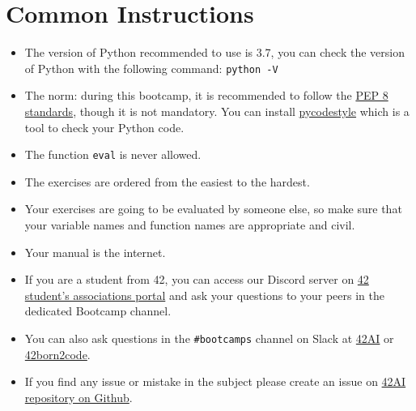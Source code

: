
\chapter{Common Instructions}
\begin{itemize}
  \item The version of Python recommended to use is 3.7, you can
  check the version of Python with the following command: \texttt{python -V}
  
  \item The norm: during this bootcamp, it is recommended to follow the
  \href{https://www.python.org/dev/peps/pep-0008/}{PEP 8 standards}, though it is not mandatory.
  You can install \href{https://pypi.org/project/pycodestyle}{pycodestyle} which
  is a tool to check your Python code.
  \item The function \texttt{eval} is never allowed.
  \item The exercises are ordered from the easiest to the hardest.
  \item Your exercises are going to be evaluated by someone else,
  so make sure that your variable names and function names are appropriate and civil.
  \item Your manual is the internet.
  
  \item If you are a student from 42, you can access our Discord server 
  on \href{https://discord.com/channels/887850395697807362/887850396314398720}{42 student's associations portal} and ask your
  questions to your peers in the dedicated Bootcamp channel. 

  \item You can also ask questions in the \texttt{\#bootcamps} channel on Slack at \href{https://42-ai.slack.com}{42AI}
  or \href{42born2code.slack.com}{42born2code}.
  
  \item If you find any issue or mistake in the subject please create an issue on \href{https://github.com/42-AI/bootcamp_python/issues}{42AI repository on Github}.
  

\end{itemize}

